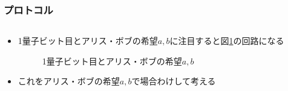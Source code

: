 \begin{frame}
  \frametitle{プロトコル}

  \begin{columns}
    \begin{column}{0.5\textwidth}
    \end{column}
    \begin{column}{0.5\textwidth}
      \pause
    \end{column}
  \end{columns}

  \pause
  \begin{itemize}
    \item 1量子ビット目とアリス・ボブの希望$a,b$に注目すると図\ref{fig:1st_qubit}の回路になる
    \begin{figure}
      \centering
      \caption{1量子ビット目とアリス・ボブの希望$a, b$}
      \label{fig:1st_qubit}
    \end{figure}

    \item<+-> これをアリス・ボブの希望$a, b$で場合わけして考える
  \end{itemize}
\end{frame}

